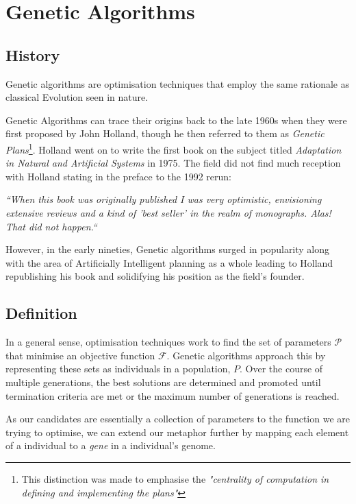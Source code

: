 \section{Genetic Algorithms}

\subsection{History}

Genetic algorithms are optimisation techniques that employ the same rationale as classical Evolution seen in nature.

Genetic Algorithms can trace their origins back to the late 1960s when they were first proposed by John Holland, though he then referred to them as \textit{Genetic Plans}\footnote{This distinction was made to emphasise the \textit{"centrality of computation in defining and implementing the plans"}\cite{hollandAdaptationNaturalArtificial1992a}}. Holland went on to write the first book on the subject titled \textit{Adaptation in Natural and Artificial Systems}\cite{hollandAdaptationNaturalArtificial1992a} in 1975. The field did not find much reception with Holland stating in the preface to the 1992 rerun:

\begin{displayquote}
\textit{``When this book was originally published I was very optimistic, envisioning extensive reviews and a kind of 'best seller' in the realm of monographs. Alas! That did not happen.``}
\end{displayquote}

However, in the early nineties, Genetic algorithms surged in popularity along with the area of Artificially Intelligent planning as a whole leading to Holland republishing his book and solidifying his position as the field's founder.

\subsection{Definition}
In a general sense, optimisation techniques work to find the set of parameters $\mathcal{P}$ that minimise an objective function $\mathcal{F}$. 
Genetic algorithms approach this by representing these sets as individuals in a population, $P$. Over the course of multiple generations, the best solutions are determined and promoted until termination criteria are met or the maximum number of generations is reached.

As our candidates are essentially a collection of parameters to the function we are trying to optimise, we can extend our metaphor further by mapping each element of a individual to a \textit{gene} in a individual's genome. 

